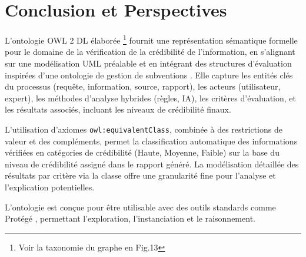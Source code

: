 \documentclass[9pt,twocolumn,twoside,french]{article}
\begin{document}
\section{Conclusion et Perspectives}
\label{sec:conclusion}

L'ontologie OWL 2 DL élaborée \footnote{Voir la taxonomie du graphe en Fig.13} fournit une représentation sémantique formelle pour le domaine de la vérification de la crédibilité de l'information, en s'alignant sur une modélisation UML préalable \parencite{Loyer2004Projet} et en intégrant des structures d'évaluation inspirées d'une ontologie de gestion de subventions \parencite{Loyer2018Rapport}. Elle capture les entités clés du processus (requête, information, source, rapport), les acteurs (utilisateur, expert), les méthodes d'analyse hybrides (règles, IA), les critères d'évaluation, et les résultats associés, incluant les niveaux de crédibilité finaux.

L'utilisation d'axiomes \texttt{owl:equivalentClass}, combinée à des restrictions de valeur et des compléments, permet la classification automatique des informations vérifiées en catégories de crédibilité (Haute, Moyenne, Faible) sur la base du niveau de crédibilité assigné dans le rapport généré. La modélisation détaillée des résultats par critère via la classe  offre une granularité fine pour l'analyse et l'explication potentielles.

L'ontologie est conçue pour être utilisable avec des outils standards comme Protégé \parencite{The2013Protg}, permettant l'exploration, l'instanciation et le raisonnement.
\end{document}
